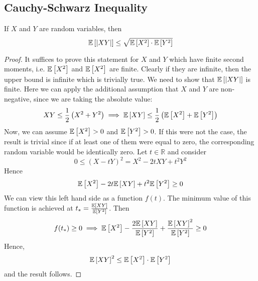 \subsection{Cauchy-Schwarz Inequality}
\begin{theorem}
	If $X$ and $Y$ are random variables, then
	\[ \mathbb{E}\left[{\abs{XY}}\right] \leq \sqrt{\mathbb{E}\left[{X^2}\right]\cdot\mathbb{E}\left[{Y^2}\right]} \]
\end{theorem}
\begin{proof}
	It suffices to prove this statement for $X$ and $Y$ which have finite second moments, i.e. $\mathbb{E}\left[{X^2}\right]$ and $\mathbb{E}\left[{X^2}\right]$ are finite. Clearly if they are infinite, then the upper bound is infinite which is trivially true. We need to show that $\mathbb{E}\left[{\abs{XY}}\right]$ is finite. Here we can apply the additional assumption that $X$ and $Y$ are non-negative, since we are taking the absolute value:
	\[ XY \leq \frac{1}{2}\left(X^2 + Y^2\right) \implies \mathbb{E}\left[{XY}\right] \leq \frac{1}{2}\left( \mathbb{E}\left[{X^2}\right] + \mathbb{E}\left[{Y^2}\right]  \right) \]
	Now, we can assume $\mathbb{E}\left[{X^2}\right] > 0$ and $\mathbb{E}\left[{Y^2}\right] > 0$. If this were not the case, the result is trivial since if at least one of them were equal to zero, the corresponding random variable would be identically zero. Let $t \in \mathbb R$ and consider
	\[ 0 \leq (X - tY)^2 = X^2 - 2tXY + t^2Y^2 \]
	Hence
	\[ \mathbb{E}\left[{X^2}\right] - 2t\mathbb{E}\left[{XY}\right] + t^2\mathbb{E}\left[{Y^2}\right] \geq 0 \]
	We can view this left hand side as a function $f(t)$. The minimum value of this function is achieved at $t_\ast = \frac{\mathbb{E}\left[{XY}\right]}{\mathbb{E}\left[{Y^2}\right]}$. Then
	\[ f(t_\ast) \geq 0 \implies \mathbb{E}\left[{X^2}\right] - \frac{2\mathbb{E}\left[{XY}\right]}{\mathbb{E}\left[{Y^2}\right]} + \frac{\mathbb{E}\left[{XY}\right]^2}{\mathbb{E}\left[{Y^2}\right]} \geq 0 \]
	Hence,
	\[ \mathbb{E}\left[{XY}\right]^2 \leq \mathbb{E}\left[{X^2}\right]\cdot \mathbb{E}\left[{Y^2}\right] \]
	and the result follows.
\end{proof}
